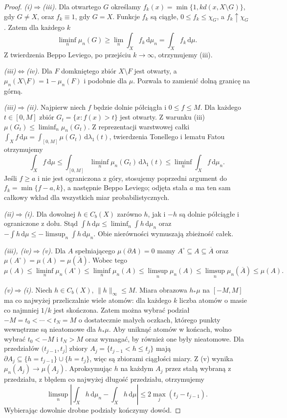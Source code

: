 \begin{proof}
\emph{(i)$\Rightarrow$(iii).}
Dla otwartego $G$ określamy
$f_k(x)=\min\{1,kd(x,X\setminus G)\}$, gdy
$G\neq X$, oraz $f_k\equiv1$, gdy $G=X$.
Funkcje $f_k$ są ciągłe, $0\le f_k\le\chi_G$,
a $f_k\uparrow\chi_G$. Zatem dla każdego $k$
\[
\liminf_n\mu_n(G)\ge\lim_n\int_X f_k\,\mathrm d\mu_n
=\int_X f_k\,\mathrm d\mu.
\]
Z twierdzenia Beppo Leviego, po przejściu $k\to\infty$,
otrzymujemy (iii).

\emph{(iii)$\Leftrightarrow$(iv).}
Dla $F$ domkniętego zbiór $X\setminus F$ jest otwarty,
a $\mu_n(X\setminus F)=1-\mu_n(F)$ i podobnie
dla $\mu$. Pozwala to zamienić dolną granicę na górną.

\emph{(iii)$\Rightarrow$(ii).}
Najpierw niech $f$ będzie dolnie półciągła i
$0\le f\le M$. Dla każdego $t\in[0,M]$ zbiór
$G_t=\{x:f(x)>t\}$ jest otwarty. Z warunku (iii)
$\mu(G_t)\le\liminf_n\mu_n(G_t)$.
Z reprezentacji warstwowej całki
$\int_X f\,\mathrm d\mu=\int_{[0,M]}\mu(G_t)
\,\mathrm d\lambda_1(t)$, twierdzenia Tonellego
i lematu Fatou otrzymujemy
\[
\int_X f\,\mathrm d\mu
\le\int_{[0,M]}\liminf_n\mu_n(G_t)\,\mathrm d\lambda_1(t)
\le\liminf_n\int_Xf\,\mathrm d\mu_n.
\]
Jeśli $f\ge a$ i nie jest ograniczona z góry,
stosujemy poprzedni argument do
$f_k=\min\{f-a,k\}$, a następnie Beppo Leviego;
odjęta stała $a$ ma ten sam całkowy wkład dla
wszystkich miar probabilistycznych.

\emph{(ii)$\Rightarrow$(i).}
Dla dowolnej $h\in C_b(X)$ zarówno $h$, jak i $-h$
są dolnie półciągłe i ograniczone z dołu. Stąd
$\int h\,\mathrm d\mu\le\liminf_n\int h\,\mathrm d\mu_n$
oraz $-\int h\,\mathrm d\mu\le
-\limsup_n\int h\,\mathrm d\mu_n$.
Obie nierówności wymuszają zbieżność całek.

\emph{(iii), (iv)$\Rightarrow$(v).}
Dla $A$ spełniającego $\mu(\partial A)=0$ mamy
$A^\circ\subseteq A\subseteq\overline A$ oraz
$\mu(A^\circ)=\mu(A)=\mu(\overline A)$.
Wobec tego
\[
\mu(A)\le\liminf_n\mu_n(A^\circ)
\le\liminf_n\mu_n(A)
\le\limsup_n\mu_n(A)
\le\limsup_n\mu_n(\overline A)\le\mu(A).
\]

\emph{(v)$\Rightarrow$(i).}
Niech $h\in C_b(X)$, $\|h\|_\infty\le M$.
Miara obrazowa $h_*\mu$ na $[-M,M]$ ma co najwyżej
przeliczalnie wiele atomów: dla każdego $k$ liczba
atomów o masie co najmniej $1/k$ jest skończona.
Zatem można wybrać podział
$-M=t_0<\cdots<t_N=M$ o dostatecznie małych oczkach,
którego punkty wewnętrzne są nieatomowe dla $h_*\mu$.
Aby uniknąć atomów w końcach, wolno wybrać
$t_0<-M$ i $t_N>M$ oraz wymagać, by również one
były nieatomowe. Dla przedziałów $(t_{j-1},t_j]$
zbiory $A_j=\{t_{j-1}<h\le t_j\}$ mają
$\partial A_j\subseteq\{h=t_{j-1}\}\cup\{h=t_j\}$,
więc są zbiorami ciągłości miary. Z (v) wynika
$\mu_n(A_j)\to\mu(A_j)$. Aproksymując $h$
na każdym $A_j$ przez stałą wybraną z przedziału,
z błędem co najwyżej długość przedziału, otrzymujemy
\[
 \limsup_n\left|\int_Xh\,\mathrm d\mu_n-
 \int_Xh\,\mathrm d\mu\right|
 \le2\max_j(t_j-t_{j-1}).
\]
Wybierając dowolnie drobne podziały kończymy dowód.
\end{proof}

